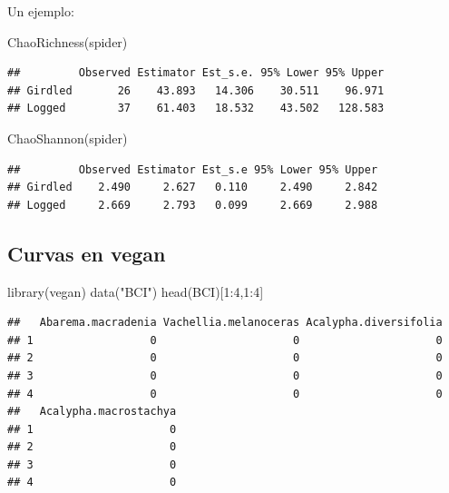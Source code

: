 \documentclass[
]{article}
\newenvironment{Shaded}{\begin{snugshade}}{\end{snugshade}}
\newcommand{\DecValTok}[1]{\textcolor[rgb]{0.00,0.00,0.81}{#1}}
\newcommand{\FunctionTok}[1]{\textcolor[rgb]{0.00,0.00,0.00}{#1}}
\newcommand{\NormalTok}[1]{#1}
\newcommand{\SpecialCharTok}[1]{\textcolor[rgb]{0.00,0.00,0.00}{#1}}
\newcommand{\StringTok}[1]{\textcolor[rgb]{0.31,0.60,0.02}{#1}}
\begin{document}
\hfill\break

Un ejemplo:

\begin{Shaded}
\begin{Highlighting}[]
\FunctionTok{ChaoRichness}\NormalTok{(spider)}
\end{Highlighting}
\end{Shaded}

\begin{verbatim}
##         Observed Estimator Est_s.e. 95% Lower 95% Upper
## Girdled       26    43.893   14.306    30.511    96.971
## Logged        37    61.403   18.532    43.502   128.583
\end{verbatim}

\begin{Shaded}
\begin{Highlighting}[]
\FunctionTok{ChaoShannon}\NormalTok{(spider)}
\end{Highlighting}
\end{Shaded}

\begin{verbatim}
##         Observed Estimator Est_s.e 95% Lower 95% Upper
## Girdled    2.490     2.627   0.110     2.490     2.842
## Logged     2.669     2.793   0.099     2.669     2.988
\end{verbatim}

\hypertarget{curvas-en-vegan}{%
\subsection{Curvas en vegan}\label{curvas-en-vegan}}

\begin{Shaded}
\begin{Highlighting}[]
\FunctionTok{library}\NormalTok{(vegan)}
\FunctionTok{data}\NormalTok{(}\StringTok{"BCI"}\NormalTok{)}
\FunctionTok{head}\NormalTok{(BCI)[}\DecValTok{1}\SpecialCharTok{:}\DecValTok{4}\NormalTok{,}\DecValTok{1}\SpecialCharTok{:}\DecValTok{4}\NormalTok{]}
\end{Highlighting}
\end{Shaded}

\begin{verbatim}
##   Abarema.macradenia Vachellia.melanoceras Acalypha.diversifolia
## 1                  0                     0                     0
## 2                  0                     0                     0
## 3                  0                     0                     0
## 4                  0                     0                     0
##   Acalypha.macrostachya
## 1                     0
## 2                     0
## 3                     0
## 4                     0
\end{verbatim}
\end{document}
